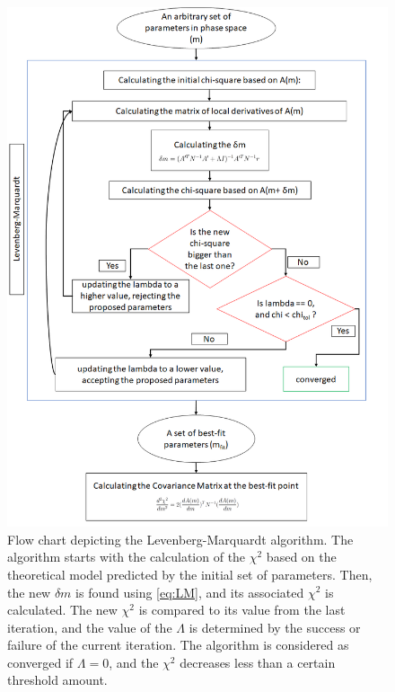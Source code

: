 \documentclass[12pt, TexShade, letterpaper]{report}
\begin{document}
\begin{figure}[h!]
\centering
\includegraphics[scale =0.7]{LM_flow.png}
\caption[Flow chart of \gls{lm}]{Flow chart depicting the Levenberg-Marquardt algorithm. The algorithm starts with the calculation of the $\chi^2$ based on the theoretical model predicted by the initial set of parameters. Then, the new $\delta m$ is found using \ref{eq:LM}, and its associated $\chi^2$ is calculated. The new $\chi^2$ is compared to its value from the last iteration, and the value of the $\Lambda$ is determined by the success or failure of the current iteration. The algorithm is considered as converged if $\Lambda = 0$, and the $\chi^2$ decreases less than a certain threshold amount.}
\label{fig:LM_flow}
\end{figure}
\end{document}

